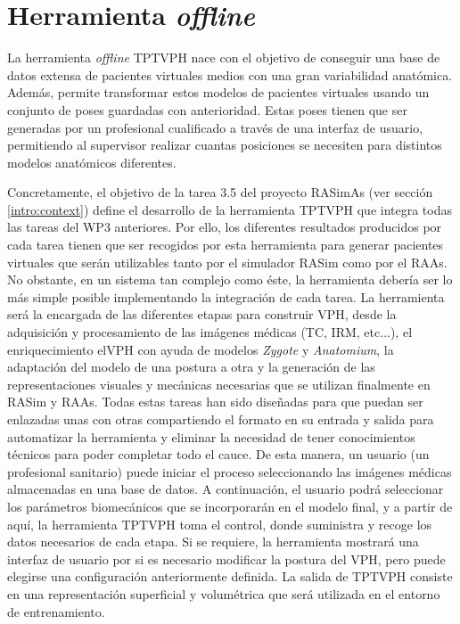 \section{Herramienta \emph{offline}}
\label{rasim:herramienta}

La herramienta \emph{offline} \ac{TPTVPH} nace con el objetivo de conseguir una base de datos extensa de pacientes virtuales medios con una gran variabilidad anatómica. Además, permite transformar estos modelos de pacientes virtuales usando un conjunto de poses guardadas con anterioridad. Estas poses tienen que ser generadas por un profesional cualificado a través de una interfaz de usuario, permitiendo al supervisor realizar cuantas posiciones se necesiten para distintos modelos anatómicos diferentes.

Concretamente, el objetivo de la tarea 3.5 del proyecto \ac{RASimAs} (ver sección \ref{intro:context}) define el desarrollo de la herramienta \ac{TPTVPH} que integra todas las tareas del \acs{WP}3 anteriores. Por ello, los diferentes resultados producidos por cada tarea tienen que ser recogidos por esta herramienta para generar pacientes virtuales que serán utilizables tanto por el simulador \ac{RASim} como por el \ac{RAAs}. No obstante, en un sistema tan complejo como éste, la herramienta debería ser lo más simple posible implementando la integración de cada tarea. La herramienta será la encargada de las diferentes etapas para construir \ac{VPH}, desde la adquisición y procesamiento de las imágenes médicas (\ac{TC}, \ac{IRM}, etc...), el enriquecimiento el\ac{VPH} con ayuda de modelos \emph{Zygote} y \emph{Anatomium}, la adaptación del modelo de una postura a otra y la generación de las representaciones visuales y mecánicas necesarias que se utilizan finalmente en \ac{RASim} y \ac{RAAs}. Todas estas tareas han sido diseñadas para que puedan ser enlazadas unas con otras compartiendo el formato en su entrada y salida para automatizar la herramienta y eliminar la necesidad de tener conocimientos técnicos para poder completar todo el cauce. De esta manera, un usuario (un profesional sanitario) puede iniciar el proceso seleccionando las imágenes médicas almacenadas en una base de datos. A continuación, el usuario podrá seleccionar los parámetros biomecánicos que se incorporarán en el modelo final, y a partir de aquí, la herramienta \ac{TPTVPH} toma el control, donde suministra y recoge los datos necesarios de cada etapa. Si se requiere, la herramienta mostrará una interfaz de usuario por si es necesario modificar la postura del \ac{VPH}, pero puede elegirse una configuración anteriormente definida. La salida de \ac{TPTVPH} consiste en una representación superficial y volumétrica que será utilizada en el entorno de entrenamiento.


